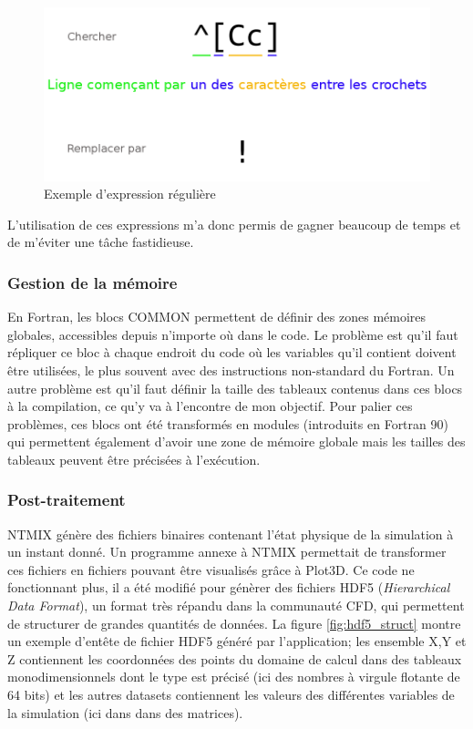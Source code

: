 \begin{figure}[ht]
  \centering
  \includegraphics[scale=0.3]{figures/regex.png}
  \caption{\label{fig:regex}Exemple d'expression régulière}
\end{figure}


L'utilisation de ces expressions m'a donc permis de gagner beaucoup de temps et de m'éviter une tâche fastidieuse.

\subsubsection{Gestion de la mémoire}En Fortran, les blocs COMMON permettent de définir des zones mémoires globales, accessibles depuis n'importe où dans le code. Le problème est qu'il faut répliquer ce bloc à chaque endroit du code où les variables qu'il contient doivent être utilisées, le plus souvent avec des instructions non-standard du Fortran. Un autre problème est qu'il faut définir la taille des tableaux contenus dans ces blocs à la compilation, ce qu'y va à l'encontre de mon objectif. Pour palier ces problèmes, ces blocs ont été transformés en modules (introduits en Fortran 90) qui permettent également d'avoir une zone de mémoire globale mais les tailles des tableaux peuvent être précisées à l'exécution.

\subsubsection{Post-traitement}NTMIX génère des fichiers binaires contenant l'état physique de la simulation à un instant donné. Un programme annexe à NTMIX permettait de transformer ces fichiers en fichiers pouvant être visualisés grâce à Plot3D. Ce code ne fonctionnant plus, il a été modifié pour génèrer des fichiers HDF5 (\textit{Hierarchical Data Format}), un format très répandu dans la communauté CFD, qui permettent de structurer de grandes quantités de données. La figure \ref{fig:hdf5_struct} montre un exemple d'entête de fichier HDF5 généré par l'application; les ensemble X,Y et Z contiennent les coordonnées des points du domaine de calcul dans des tableaux monodimensionnels dont le type est précisé (ici des nombres à virgule flotante de 64 bits) et les autres datasets contiennent les valeurs des différentes variables de la simulation (ici dans dans des matrices).

